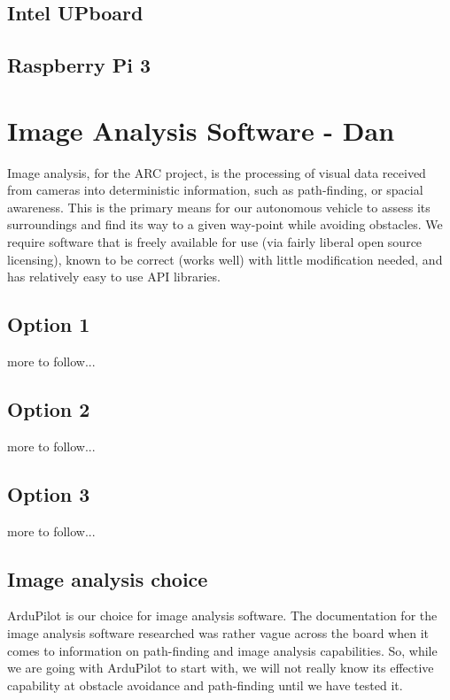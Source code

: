 \documentclass[compsoc,draftclsnofoot,onecolumn,10pt]{IEEEtran}
\begin{document}
\subsection{Intel UPboard}

\subsection{Raspberry Pi 3}

\newpage

\section{Image Analysis Software - Dan}
Image analysis, for the ARC project, is the processing of visual data received
from cameras into deterministic information, such as path-finding, or spacial
awareness. This is the primary means for our autonomous vehicle to assess its
surroundings and find its way to a given way-point while avoiding obstacles. We
require software that is freely available for use (via fairly liberal open
source licensing), known to be correct (works well) with little modification
needed, and has relatively easy to use API libraries.

\subsection{Option 1}
more to follow...

\subsection{Option 2}
more to follow...

\subsection{Option 3}
more to follow...

\subsection{Image analysis choice}
ArduPilot is our choice for image analysis software. The documentation for the
image analysis software researched was rather vague across the board when it
comes to information on path-finding and image analysis capabilities. So, while
we are going with ArduPilot to start with, we will not really know its effective
capability at obstacle avoidance and path-finding until we have tested it.
\end{document}
